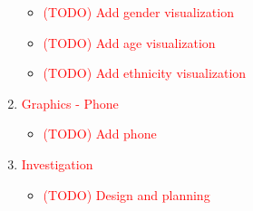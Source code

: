 \documentclass[a4paper, twoside]{article}
\begin{document}
\begin{enumerate}
\begin{itemize}
		\item{} \textcolor{red}{(TODO) Add gender visualization}
		\item{} \textcolor{red}{(TODO) Add age visualization}
		\item{} \textcolor{red}{(TODO) Add ethnicity visualization}
	\end{itemize}
	\item{} \textcolor{red}{Graphics - Phone} \begin{itemize}
		\item{} \textcolor{red}{(TODO) Add phone}
	\end{itemize}
	\item{} \textcolor{red}{Investigation} \begin{itemize}
		\item{} \textcolor{red}{(TODO) Design and planning}
	\end{itemize}
\end{enumerate}
\end{document}
